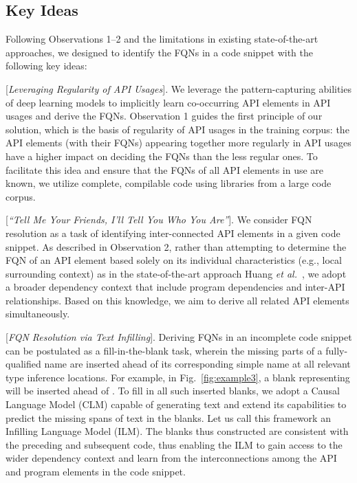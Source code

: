 \subsection{Key Ideas}
\label{sec:key}
Following Observations 1--2 and the limitations in existing state-of-the-art approaches, we designed {\tool} to identify the FQNs in a code snippet with the following key ideas:

\vspace{2pt}
 [{\em Leveraging Regularity of API Usages}].
We leverage the pattern-capturing abilities of deep learning models to implicitly learn co-occurring API elements in API usages and derive the FQNs. Observation 1 guides the first principle of our solution, which is the basis of regularity of API usages in the training corpus: the API elements (with their FQNs) appearing together more regularly in API usages have a higher impact on deciding the FQNs than the less regular ones. To facilitate this idea and ensure that the FQNs of all API elements in use are known, we utilize complete, compilable code using libraries from a large code corpus.

\vspace{2pt}
 [{\em ``Tell Me Your Friends, I'll Tell You Who You Are''}].
We consider FQN resolution as a task of identifying inter-connected API elements in a given code snippet. As described in Observation 2, rather than attempting to determine the FQN of an API element based solely on its individual characteristics (e.g., local surrounding context) as in the state-of-the-art approach Huang {\em et al.}~\cite{prompt-ase22}, we adopt a broader dependency context that include program dependencies and inter-API relationships. Based on this knowledge, we aim to derive all related API elements simultaneously.


\vspace{2pt}
 [{\em FQN Resolution via Text Infilling}].
Deriving FQNs in an incomplete code snippet can be postulated as a fill-in-the-blank task, wherein the missing parts of a fully-qualified name are inserted ahead of its corresponding simple name at all relevant type inference locations. For example, in Fig.~\ref{fig:example3}, a blank representing  will be inserted ahead of . To fill in all such inserted blanks, we adopt a Causal Language Model (CLM) capable of generating text and extend its capabilities to predict the missing spans of text in the blanks. Let us call this framework an Infilling Language Model (ILM). The blanks thus constructed are consistent with the preceding and subsequent code, thus enabling the ILM to gain access to the wider dependency context and learn from the interconnections among the API and program elements in the code snippet.
